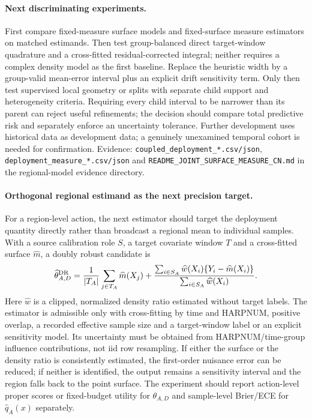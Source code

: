 \documentclass[11pt,a4paper]{article}
\numberwithin{equation}{section}
\theoremstyle{definition}\newtheorem{definition}[theorem]{Definition}
\theoremstyle{remark}\newtheorem{remark}[theorem]{Remark}
\begin{document}
\paragraph{Next discriminating experiments.}
First compare fixed-measure surface models and fixed-surface measure estimators on matched estimands. Then test group-balanced direct target-window quadrature and a cross-fitted residual-corrected integral; neither requires a complex density model as the first baseline. Replace the heuristic width by a group-valid mean-error interval plus an explicit drift sensitivity term. Only then test supervised local geometry or splits with separate child support and heterogeneity criteria. Requiring every child interval to be narrower than its parent can reject useful refinements; the decision should compare total predictive risk and separately enforce an uncertainty tolerance. Further development uses historical data as development data; a genuinely unexamined temporal cohort is needed for confirmation. Evidence: \texttt{coupled\_deployment\_*.csv/json}, \texttt{deployment\_measure\_*.csv/json} and \texttt{README\_JOINT\_SURFACE\_MEASURE\_CN.md} in the regional-model evidence directory.

\paragraph{Orthogonal regional estimand as the next precision target.}
For a region-level action, the next estimator should target the deployment quantity directly rather than broadcast a regional mean to individual samples. With a source calibration role $S$, a target covariate window $T$ and a cross-fitted surface $\widehat m$, a doubly robust candidate is
\[
 \widehat\theta_{A,D}^{\rm DR} =
 \frac{1}{|T_A|}\sum_{j\in T_A}\widehat m(X_j)
 +
 \frac{\sum_{i\in S_A}\widehat w(X_i)\{Y_i-\widehat m(X_i)\}}
      {\sum_{i\in S_A}\widehat w(X_i)} .
\]
Here $\widehat w$ is a clipped, normalized density ratio estimated without target labels. The estimator is admissible only with cross-fitting by time and HARPNUM, positive overlap, a recorded effective sample size and a target-window label or an explicit sensitivity model. Its uncertainty must be obtained from HARPNUM/time-group influence contributions, not iid row resampling. If either the surface or the density ratio is consistently estimated, the first-order nuisance error can be reduced; if neither is identified, the output remains a sensitivity interval and the region falls back to the point surface. The experiment should report action-level proper scores or fixed-budget utility for $\theta_{A,D}$ and sample-level Brier/ECE for $\widehat q_A(x)$ separately.
\end{document}
